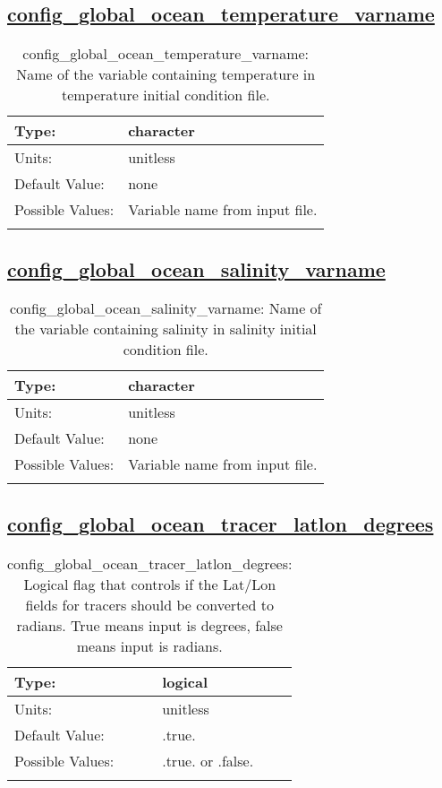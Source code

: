 \subsection[config\_global\_ocean\_temperature\_varname]{\hyperref[sec:nm_tab_global_ocean]{config\_global\_ocean\_temperature\_varname}}
\label{subsec:nm_sec_config_global_ocean_temperature_varname}
\begin{center}
\begin{longtable}{| p{2.0in} || p{4.0in} |}
    \hline
    Type: & character \\
    \hline
    Units: & \si{unitless} \\
    \hline
    Default Value: & none \\
    \hline
    Possible Values: & Variable name from input file. \\
    \hline
    \caption{config\_global\_ocean\_temperature\_varname: Name of the variable containing temperature in temperature initial condition file.}
\end{longtable}
\end{center}
\subsection[config\_global\_ocean\_salinity\_varname]{\hyperref[sec:nm_tab_global_ocean]{config\_global\_ocean\_salinity\_varname}}
\label{subsec:nm_sec_config_global_ocean_salinity_varname}
\begin{center}
\begin{longtable}{| p{2.0in} || p{4.0in} |}
    \hline
    Type: & character \\
    \hline
    Units: & \si{unitless} \\
    \hline
    Default Value: & none \\
    \hline
    Possible Values: & Variable name from input file. \\
    \hline
    \caption{config\_global\_ocean\_salinity\_varname: Name of the variable containing salinity in salinity initial condition file.}
\end{longtable}
\end{center}
\subsection[config\_global\_ocean\_tracer\_latlon\_degrees]{\hyperref[sec:nm_tab_global_ocean]{config\_global\_ocean\_tracer\_latlon\_degrees}}
\label{subsec:nm_sec_config_global_ocean_tracer_latlon_degrees}
\begin{center}
\begin{longtable}{| p{2.0in} || p{4.0in} |}
    \hline
    Type: & logical \\
    \hline
    Units: & \si{unitless} \\
    \hline
    Default Value: & .true. \\
    \hline
    Possible Values: & .true. or .false. \\
    \hline
    \caption{config\_global\_ocean\_tracer\_latlon\_degrees: Logical flag that controls if the Lat/Lon fields for tracers should be converted to radians. True means input is degrees, false means input is radians.}
\end{longtable}
\end{center}

